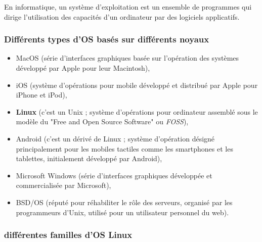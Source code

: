 En informatique, un système d'exploitation est un ensemble de programmes qui dirige l'utilisation des capacités d'un ordinateur
par des logiciels applicatifs.\newline

\subsubsection{Différents types d'OS basés sur différents noyaux}

\begin{itemize}
\item MacOS (série d'interfaces graphiques basée sur l'opération des systèmes développé par Apple pour leur Macintosh),
\item iOS (système d'opérations pour mobile développé et distribué par Apple pour iPhone et iPod),
\item \textbf{Linux} (c'est un Unix ; système d'opérations pour ordinateur assemblé sous le modèle du "Free and Open Source Software" ou \textit{FOSS}),
\item Android (c'est un dérivé de Linux ; système d'opération désigné principalement pour les mobiles tactiles comme les smartphones
et les tablettes, initialement développé par Android),
\item Microsoft Windows (série d'interfaces graphiques développée et commercialisée par Microsoft),
\item BSD/OS (réputé pour réhabiliter le rôle des serveurs, organisé par les programmeurs d'Unix, utilisé pour un utilisateur personnel du web).\newline
\end{itemize}


\subsubsection{différentes familles d'OS Linux}

